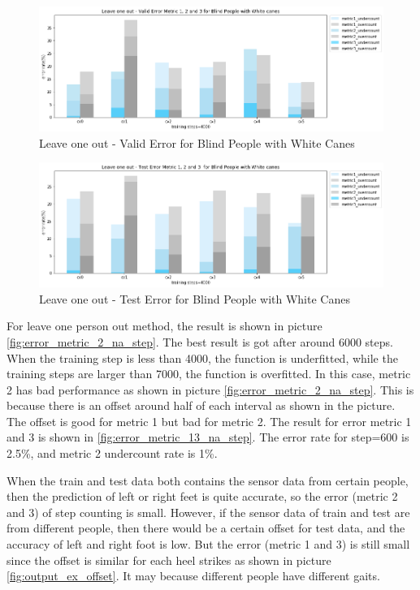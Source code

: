 \documentclass[11pt]{article}
\begin{document}
\begin{figure}[ht]
\centering
\includegraphics[scale=0.5]{error_metric_wc_10fold_valid4000}
\caption{Leave one out - Valid Error for Blind People with White Canes}
\label{fig:error_metric_wc_10fold_valid4000}
\end{figure}


\begin{figure}[ht]
\centering
\includegraphics[scale=0.5]{error_metric_wc_10fold_test4000}
\caption{Leave one out - Test Error for Blind People with White Canes}
\label{fig:error_metric_wc_10fold_test4000}
\end{figure}

For leave one person out method, the result is shown in picture \ref{fig:error_metric_2_na_step}. The best result is got after around 6000 steps. When the training step is less than 4000, the function is underfitted, while the training steps are larger than 7000, the function is overfitted. In this case, metric 2 has bad performance as shown in picture \ref{fig:error_metric_2_na_step}. This is because there is an offset around half of each interval as shown in the picture. The offset is good for metric 1 but bad for metric 2. The result for error metric 1 and 3 is shown in \ref{fig:error_metric_13_na_step}. The error rate for step=600 is 2.5\%, and metric 2 undercount rate is 1\%.

When the train and test data both contains the sensor data from certain people, then the prediction of left or right feet is quite accurate, so the error (metric 2 and 3) of step counting is small. However, if the sensor data of train and test are from different people, then there would be a certain offset for test data, and the accuracy of left and right foot is low. But the error (metric 1 and 3) is still small since the offset is similar for each heel strikes as shown in picture \ref{fig:output_ex_offset}. It may because different people have different gaits.
\end{document}
